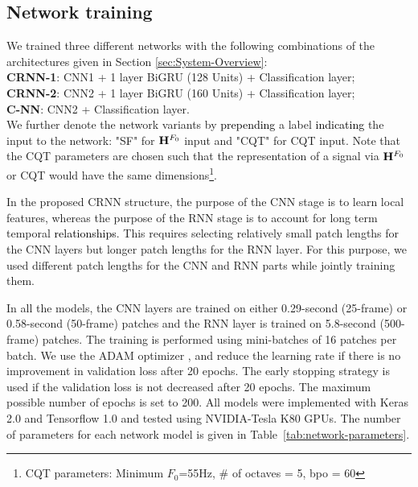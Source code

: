 \documentclass{article}
\newcommand{\jb}[1]{{\textcolor{black}{#1}}}
\newcommand{\jbcor}[2]{{\textcolor{black}{#2}}}
\begin{document}
\subsection{Network training}

We trained three different networks with the following combinations of the architectures given in Section \ref{sec:System-Overview}: \\

\hspace{-0.45cm}\textbf{CRNN-1}: CNN1 + 1 layer BiGRU (128 Units) + Classification layer;\\
\textbf{CRNN-2}: CNN2 + 1 layer BiGRU (160 Units) + Classification layer;\\
\textbf{C-NN}: CNN2 + Classification layer.\\

We further denote the network variants by \jbcor{preceding}{prepending} a label \jbcor{representing}{indicating} the input to the network: "SF" for $\mathbf{H}^{F_{0}}$ input and "CQT" for CQT input. Note that the CQT parameters are chosen such that the representation of a signal via $\mathbf{H}^{F_{0}}$ or CQT would have the same dimensions\footnote{CQT parameters: Minimum $F_0$=55Hz, $\#$ of octaves = 5, bpo = 60}.

In the proposed CRNN structure, the purpose of the CNN stage is to learn local features, whereas the purpose of the RNN stage is to account for long term temporal \jbcor{relations}{relationships}. This requires selecting relatively small patch lengths for the CNN layers but longer patch lengths for the RNN layer. For this purpose, we used different patch lengths for the CNN and RNN parts while jointly training them.

In all the models, the CNN layers are trained on either 0.29-second (25-frame) or 0.58-second (50-frame) patches and the RNN layer is trained on 5.8-second (500-frame) patches. The training is performed using mini-batches of 16 patches per batch. We use the ADAM optimizer \cite{ADAM-optimizer}, and reduce the learning rate if there is no improvement in validation loss after 20 epochs. The early stopping strategy is used if the validation loss is not decreased after 20 epochs. The maximum possible number of epochs is set to 200. All models were implemented with Keras 2.0 \cite{keras} and Tensorflow 1.0 \cite{tensorflow} and tested using NVIDIA-Tesla K80 GPUs.
The number of parameters for each network model is given in Table~\ref{tab:network-parameters}. %
\end{document}
